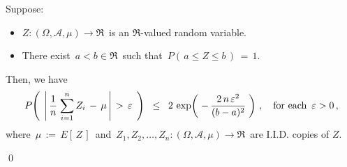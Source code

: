 
\vskip 1.0cm
\begin{lemma}
\label{lemma:HoeffdingInequality}
\mbox{}\vskip 0.2cm
\noindent
Suppose:
\begin{itemize}
\item
	$Z : (\Omega,\mathcal{A},\mu) \longrightarrow \Re$\,
	is an $\Re$-valued random variable.
\item
	There exist \,$a < b \in \Re$\, such that \,$P\!\left(\,a \leq Z \leq b\,\right) \,=\, 1$.
\end{itemize}
Then, we have
\begin{equation*}
P\!\left(\;\,\left\vert\,
	\dfrac{1}{n}\;\overset{n}{\underset{i=1}{\sum}}\,Z_{i} \, - \, \mu
	\,\right\vert
	\,>\,\varepsilon
	\;\,\right)
\;\; \leq \;\;
	2\,\exp\!\left(\;
		-\,\dfrac{
			2\,n\,\varepsilon^{2}
			}{
			(b-a)^{2}
			}
		\;\right)\,,
\quad
\textnormal{for each \,$\varepsilon > 0$}\,,
\end{equation*}
where
\,$\mu \, := \, E\!\left[\,Z\,\right]$\, and
\,$Z_{1}, Z_{2}, \ldots, Z_{n} : (\Omega,\mathcal{A},\mu) \longrightarrow \Re$\,
are I.I.D. copies of $Z$.
\end{lemma}
\proof
\qed


\renewcommand{\theenumi}{\roman{enumi}}
\renewcommand{\labelenumi}{\textnormal{(\theenumi)}$\;\;$}

